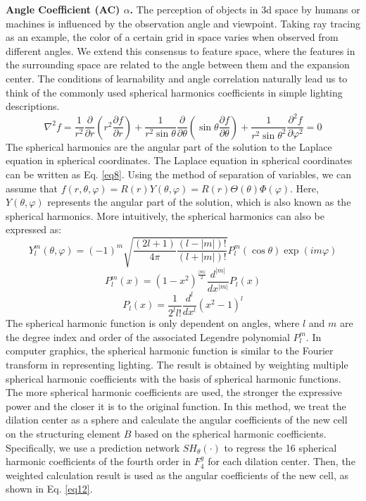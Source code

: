 \textbf{Angle Coefficient (AC) $\alpha$.} The perception of objects in 3d space by humans or machines is influenced by the observation angle and viewpoint. Taking ray tracing as an example, the color of a certain grid in space varies when observed from different angles. We extend this consensus to feature space, where the features in the surrounding space are related to the angle between them and the expansion center. The conditions of learnability and angle correlation naturally lead us to think of the commonly used spherical harmonics coefficients in simple lighting descriptions.
\begin{equation}
	\label{eq8}
	\nabla^2 f=\frac{1}{r^2}\frac{\partial}{\partial r}(r^2\frac{\partial f}{\partial r}) + \frac{1}{r^2 \sin{\theta}} \frac{\partial}{\partial \theta} (\sin{\theta} \frac{\partial f}{\partial \theta}) + \frac{1}{r^2 \sin{\theta}^2}\frac{\partial^2 f}{\partial \varphi
		^2}=0
\end{equation}
The spherical harmonics are the angular part of the solution to the Laplace equation in spherical coordinates. The Laplace equation in spherical coordinates can be written as Eq. \ref{eq8}. Using the method of separation of variables, we can assume that $f(r,\theta,\varphi)=R(r)Y(\theta,\varphi)=R(r)\Theta(\theta)\Phi(\varphi)$. Here, $Y(\theta,\varphi)$ represents the angular part of the solution, which is also known as the spherical harmonics. More intuitively, the spherical harmonics can also be expressed as:
\begin{equation}
	\label{eq9}
	Y^m_l(\theta,\varphi)=(-1)^m\sqrt{\frac{(2l+1)}{4\pi}\frac{(l-|m|)!}{(l+|m|)!}}P^m_l(\cos{\theta})\exp(im\varphi)
\end{equation}
\begin{equation}
	\label{eq10}
	P^m_l(x)=(1-x^2)^{\frac{|m|}{2}}\frac{d^{|m|}}{dx^{|m|}}P_l(x)
\end{equation}
\begin{equation}
	\label{eq11}
	P_l(x)=\frac{1}{2^l l!}\frac{d^l}{dx^l}(x^2-1)^l
\end{equation}
The spherical harmonic function is only dependent on angles, where $l$ and $m$ are the degree index and order of the associated Legendre polynomial $P^m_l$. In computer graphics, the spherical harmonic function is similar to the Fourier transform in representing lighting. The result is obtained by weighting multiple spherical harmonic coefficients with the basis of spherical harmonic functions. The more spherical harmonic coefficients are used, the stronger the expressive power and the closer it is to the original function. In this method, we treat the dilation center as a sphere and calculate the angular coefficients of the new cell on the structuring element $B$ based on the spherical harmonic coefficients. Specifically, we use a prediction network $SH_\theta(\cdot)$ to regress the 16 spherical harmonic coefficients of the fourth order in $F^g_4$ for each dilation center. Then, the weighted calculation result is used as the angular coefficients of the new cell, as shown in Eq. \ref{eq12}.

